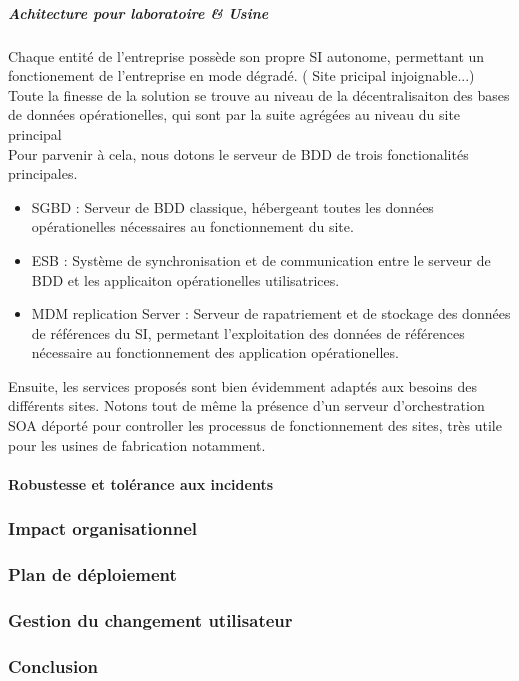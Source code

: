 \subparagraph{Achitecture pour laboratoire & Usine}

Chaque entité de l'entreprise possède son propre SI autonome, permettant un fonctionement de l'entreprise en mode dégradé. ( Site pricipal injoignable...)
Toute la finesse de la solution se trouve au niveau de la décentralisaiton des bases de données opérationelles, qui sont par la suite agrégées au niveau du site principal \\
Pour parvenir  à cela, nous dotons le serveur de BDD de trois fonctionalités principales.
\begin{itemize}
\item SGBD : Serveur de BDD classique, hébergeant toutes les données opérationelles nécessaires au fonctionnement du site.
\item ESB : Système de synchronisation et de communication entre le serveur de BDD et les applicaiton opérationelles utilisatrices.
\item MDM replication Server :  Serveur de rapatriement et de stockage des données de références du SI, permetant l'exploitation des données de références nécessaire au fonctionnement des application opérationelles.
\end{itemize}

Ensuite, les services proposés sont bien évidemment adaptés aux besoins des différents sites. Notons tout de même la présence d'un serveur d'orchestration SOA déporté pour controller les processus de fonctionnement des sites, très utile pour les usines de fabrication notamment.

\paragraph{Robustesse et tolérance aux incidents}

\subsubsection{Impact organisationnel}

\subsubsection{Plan de déploiement}

\subsubsection{Gestion du changement utilisateur}

\subsubsection{Conclusion}

